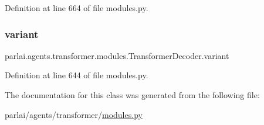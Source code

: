 Definition at line 664 of file modules.\+py.

\mbox{\label{classparlai_1_1agents_1_1transformer_1_1modules_1_1TransformerDecoder_a84349da2592ce07a34257a3995dd2254}} 
\subsubsection{\texorpdfstring{variant}{variant}}
{\footnotesize\ttfamily parlai.\+agents.\+transformer.\+modules.\+Transformer\+Decoder.\+variant}



Definition at line 644 of file modules.\+py.



The documentation for this class was generated from the following file\+:\begin{DoxyCompactItemize}
\item 
parlai/agents/transformer/\hyperlink{parlai_2agents_2transformer_2modules_8py}{modules.\+py}\end{DoxyCompactItemize}
